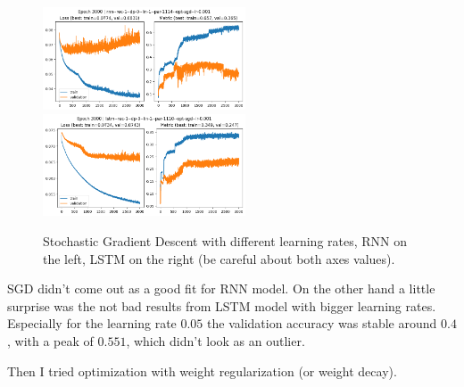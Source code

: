 \documentclass[a4paper,10pt]{article}
\begin{document}
\begin{figure}[H]
\begin{center}
            \includegraphics[width=6cm]{figures/rnn--rec-1--dp-0--lin-1--par-1114--opt-sgd--lr-0.001--e-3000.png}
            \includegraphics[width=6cm]{figures/lstm--rec-1--dp-0--lin-1--par-1110--opt-sgd--lr-0.001--e-3000.png}
      \end{center}
      \caption{Stochastic Gradient Descent with different learning rates, RNN on the left, LSTM on the right (be careful about both axes values).}
      \label{fig4}
\end{figure}

SGD didn't come out as a good fit for RNN model. On the other hand a little surprise was the not bad results from LSTM model with bigger learning rates.
Especially for the learning rate $0.05$ the validation accuracy was stable around $0.4$, with a peak of $0.551$, which didn't look as an outlier.

Then I tried optimization with weight regularization (or weight decay).
\end{document}
